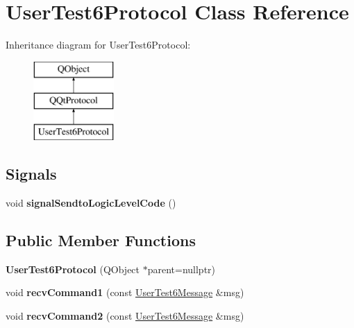 \hypertarget{class_user_test6_protocol}{}\section{User\+Test6\+Protocol Class Reference}
\label{class_user_test6_protocol}
Inheritance diagram for User\+Test6\+Protocol\+:\begin{figure}[H]
\begin{center}
\leavevmode
\includegraphics[height=3.000000cm]{class_user_test6_protocol}
\end{center}
\end{figure}
\subsection*{Signals}
\begin{DoxyCompactItemize}
\item 
\mbox{\label{class_user_test6_protocol_af1270a5502dac2b908c0b69d2b99403c}} 
void {\bfseries signal\+Sendto\+Logic\+Level\+Code} ()
\end{DoxyCompactItemize}
\subsection*{Public Member Functions}
\begin{DoxyCompactItemize}
\item 
\mbox{\label{class_user_test6_protocol_a9e84294d26b8d2decf3b9f34527aa178}} 
{\bfseries User\+Test6\+Protocol} (Q\+Object $\ast$parent=nullptr)
\item 
\mbox{\label{class_user_test6_protocol_ad5d5ef4e8498a614c6c74d44afe26ec3}} 
void {\bfseries recv\+Command1} (const \mbox{\hyperlink{class_user_test6_message}{User\+Test6\+Message}} \&msg)
\item 
\mbox{\label{class_user_test6_protocol_ab3b7e1a4baa663137bc7313252b571d6}} 
void {\bfseries recv\+Command2} (const \mbox{\hyperlink{class_user_test6_message}{User\+Test6\+Message}} \&msg)
\end{DoxyCompactItemize}

